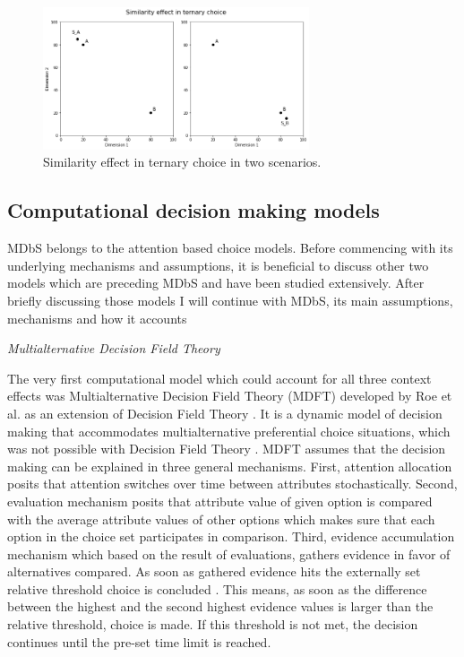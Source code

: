 \documentclass[a4paper,12pt]{article}
\newcommand{\citeyearonly}[1]{\citeyearpar{#1}}
\begin{document}
\begin{figure}[h]
    \centering
    \includegraphics[width=0.7\textwidth]{staticFiles/SimilarityEffect.png}
    \caption{Similarity effect in ternary choice in two scenarios.} %
    \label{fig:similarityEffect} %

\end{figure}


\subsection{Computational decision making models}

MDbS belongs to the attention based choice models. Before commencing with its underlying mechanisms and assumptions, it is beneficial to discuss other two models which are preceding MDbS and have been studied extensively. After briefly discussing those models I will continue with MDbS, its main assumptions, mechanisms and how it accounts 

\textit{Multialternative Decision Field Theory}

The very first computational model which could account for all three context effects was Multialternative Decision Field Theory (MDFT) developed by Roe et al. \citeyearonly{roe2001multialternative} as an extension of Decision Field Theory \citep{busemeyer1993decision}. It is a dynamic model of decision making that accommodates multialternative preferential choice situations, which was not possible with Decision Field Theory \citep{hotaling2019quantitative}. MDFT assumes that the decision making can be explained in three general mechanisms. First, attention allocation posits that attention switches over time between attributes stochastically. Second, evaluation mechanism posits that attribute value of given option is compared with the average attribute values of other options  which makes sure that each option in the choice set participates in comparison. Third, evidence accumulation mechanism which based on the result of evaluations, gathers evidence in favor of alternatives compared. As soon as gathered evidence hits the externally set relative threshold choice is concluded \citep{busemeyer2002survey}. This means, as soon as the difference between the highest and the second highest evidence values is larger than the relative threshold, choice is made. If this threshold is not met, the decision continues until the pre-set time limit is reached.
\end{document}

